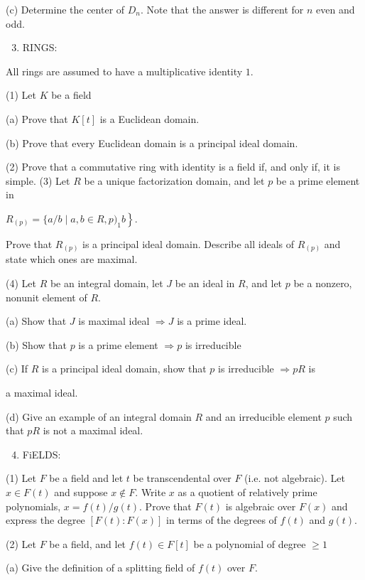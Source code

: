 \documentclass[10pt]{article}
\begin{document}
(c) Determine the center of $D_{n}$. Note that the answer is different for $n$ even and odd.

\begin{enumerate}
  \setcounter{enumi}{2}
  \item RINGS:
\end{enumerate}
All rings are assumed to have a multiplicative identity $1 .$

(1) Let $K$ be a field

(a) Prove that $K[t]$ is a Euclidean domain.

(b) Prove that every Euclidean domain is a principal ideal domain.

(2) Prove that a commutative ring with identity is a field if, and only if, it is simple. (3) Let $R$ be a unique factorization domain, and let $p$ be a prime element in

$\left.R_{(p)}=\{a / b \mid a, b \in R, p)_{1} b\right\} .$

Prove that $R_{(p)}$ is a principal ideal domain. Describe all ideals of $R_{(p)}$ and state which ones are maximal.

(4) Let $R$ be an integral domain, let $J$ be an ideal in $R$, and let $p$ be a nonzero, nonunit element of $R$.

(a) Show that $J$ is maximal ideal $\Longrightarrow J$ is a prime ideal.

(b) Show that $p$ is a prime element $\Longrightarrow p$ is irreducible

(c) If $R$ is a principal ideal domain, show that $p$ is irreducible $\Rightarrow p R$ is

a maximal ideal.

(d) Give an example of an integral domain $R$ and an irreducible element $p$ such that $p R$ is not a maximal ideal.

\begin{enumerate}
  \setcounter{enumi}{3}
  \item FiELDS:
\end{enumerate}
(1) Let $F$ be a field and let $t$ be transcendental over $F$ (i.e. not algebraic). Let $x \in F(t)$ and suppose $x \notin F$. Write $x$ as a quotient of relatively prime polynomials, $x=f(t) / g(t)$. Prove that $F(t)$ is algebraic over $F(x)$ and express the degree $[F(t): F(x)]$ in terms of the degrees of $f(t)$ and $g(t)$.

(2) Let $F$ be a field, and let $f(t) \in F[t]$ be a polynomial of degree $\geq 1$

(a) Give the definition of a splitting field of $f(t)$ over $F$.
\end{document}
